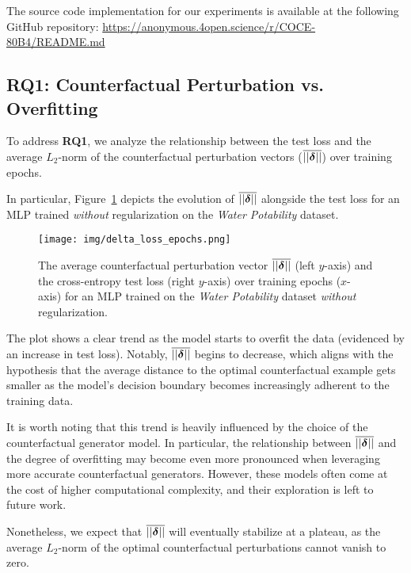 The source code implementation for our experiments is available at the following GitHub repository: \url{https://anonymous.4open.science/r/COCE-80B4/README.md} 

\subsection{RQ1: Counterfactual Perturbation vs. Overfitting}
To address \textbf{RQ1}, we analyze the relationship between the test loss and the average $L_2$-norm of the counterfactual perturbation vectors ($\overline{||\boldsymbol{\delta}||}$) over training epochs.

In particular, Figure~\ref{fig:delta_loss_epochs} depicts the evolution of $\overline{||\boldsymbol{\delta}||}$ alongside the test loss for an MLP trained \textit{without} regularization on the \textit{Water Potability} dataset. 
\begin{figure}[ht]
    \centering
    \texttt{[image: img/delta\_loss\_epochs.png]}
    \caption{The average counterfactual perturbation vector $\overline{||\boldsymbol{\delta}||}$ (left $y$-axis) and the cross-entropy test loss (right $y$-axis) over training epochs ($x$-axis) for an MLP trained on the \textit{Water Potability} dataset \textit{without} regularization.}
    \label{fig:delta_loss_epochs}
\end{figure}

The plot shows a clear trend as the model starts to overfit the data (evidenced by an increase in test loss). 
Notably, $\overline{||\boldsymbol{\delta}||}$ begins to decrease, which aligns with the hypothesis that the average distance to the optimal counterfactual example gets smaller as the model's decision boundary becomes increasingly adherent to the training data.

It is worth noting that this trend is heavily influenced by the choice of the counterfactual generator model. In particular, the relationship between $\overline{||\boldsymbol{\delta}||}$ and the degree of overfitting may become even more pronounced when leveraging more accurate counterfactual generators. However, these models often come at the cost of higher computational complexity, and their exploration is left to future work.

Nonetheless, we expect that $\overline{||\boldsymbol{\delta}||}$ will eventually stabilize at a plateau, as the average $L_2$-norm of the optimal counterfactual perturbations cannot vanish to zero.


